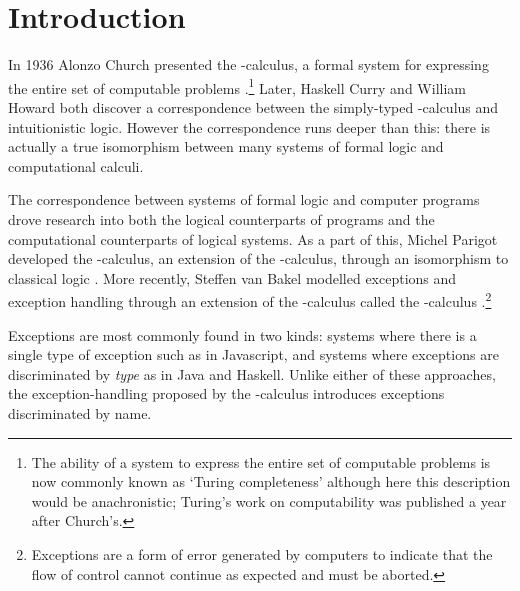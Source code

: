 \chapter{Introduction}

In 1936 Alonzo Church presented the \lam-calculus, a formal system for expressing the entire set of computable problems \cite{Church36}.\footnote{
  The ability of a system to express the entire set of computable problems is now commonly known as `Turing completeness' although here this description would be anachronistic; 
  Turing's work on computability was published a year after Church's.
}
Later, Haskell Curry and William Howard both discover a correspondence between the simply-typed \lam-calculus and intuitionistic logic. 
However the correspondence runs deeper than this: there is actually a true isomorphism between many systems of formal logic and computational calculi. 

The correspondence between systems of formal logic and computer programs drove research into both the logical counterparts of programs and the computational counterparts of logical systems.
As a part of this, Michel Parigot developed the \lmu-calculus, an extension of the \lam-calculus, 
through an isomorphism to classical logic \cite{Parigot92}.
More recently, Steffen van Bakel modelled exceptions and exception handling through an extension of the \lam-calculus called the \ltry-calculus \cite{Bakel15}.\footnote{
  Exceptions are a form of error generated by computers to indicate that the flow of control cannot continue as expected and must be aborted. 
}

Exceptions are most commonly found in two kinds: 
  systems where there is a single type of exception such as in Javascript, 
  and systems where exceptions are discriminated by \emph{type} as in Java and Haskell. 
Unlike either of these approaches, 
the exception-handling proposed by the \ltry-calculus introduces exceptions discriminated by name.

